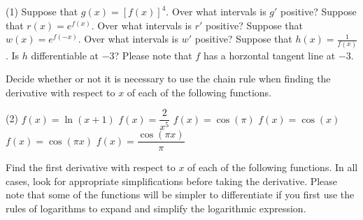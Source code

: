 \documentclass[10pt,oneside,]{book}
\theoremstyle{plain}
\theoremstyle{definition}
\numberwithin{equation}{section}
\newcommand{\fe}[2]{#1\mathopen{}\left(#2\right)\mathclose{}}
\newcommand{\fd}[1]{#1'}
\begin{document}
\par
\begin{exercisegroup}(1)
\exercise[6.]\hypertarget{exercise-487}{\null}Suppose that \(\fe{g}{x}=\left[\fe{f}{x}\right]^4\). Over what intervals is \(\fd{g}\) positive?%
\exercise[7.]\hypertarget{exercise-488}{\null}Suppose that \(\fe{r}{x}=e^{\fe{f}{x}}\). Over what intervals is \(\fd{r}\) positive?%
\exercise[8.]\hypertarget{exercise-489}{\null}Suppose that \(\fe{w}{x}=e^{\fe{f}{-x}}\). Over what intervals is \(\fd{w}\) positive?%
\exercise[9.]\hypertarget{exercise-490}{\null}Suppose that \(\fe{h}{x}=\frac{1}{\fe{f}{x}}\). Is \(h\) differentiable at \(-3\)? Please note that \(f\) has a horzontal tangent line at \(-3\).%
\end{exercisegroup}
\par\smallskip\noindent
\hypertarget{exercisegroup-102}{\null}Decide whether or not it is necessary to use the chain rule when finding the derivative with respect to \(x\) of each of the following functions.%
\par
\begin{exercisegroup}(2)
\exercise[10.]\hypertarget{exercise-491}{\null}\(\fe{f}{x}=\fe{\ln}{x+1}\)%
\exercise[11.]\hypertarget{exercise-492}{\null}\(\fe{f}{x}=\dfrac{2}{x^5}\)%
\exercise[12.]\hypertarget{exercise-493}{\null}\(\fe{f}{x}=\fe{\cos}{\pi}\)%
\exercise[13.]\hypertarget{exercise-494}{\null}\(\fe{f}{x}=\fe{\cos}{x}\)%
\exercise[14.]\hypertarget{exercise-495}{\null}\(\fe{f}{x}=\fe{\cos}{\pi x}\)%
\exercise[15.]\hypertarget{exercise-496}{\null}\(\fe{f}{x}=\dfrac{\fe{\cos}{\pi x}}{\pi}\)%
\end{exercisegroup}
\par\smallskip\noindent
\hypertarget{exercisegroup-103}{\null}Find the first derivative with respect to \(x\) of each of the following functions.  In all cases, look for appropriate simplifications before taking the derivative.  Please note that some of the functions will be simpler to differentiate if you first use the rules of logarithms to expand and simplify the logarithmic expression.%
\par
\end{document}
